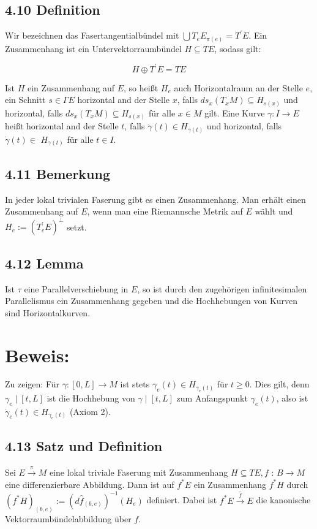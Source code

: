 \subsection*{4.10 Definition}
Wir bezeichnen das Fasertangentialbündel mit $\bigcup T_{e} E_{\pi(e)}=T^{\prime} E$. Ein Zusammenhang ist ein Untervektorraumbündel $H \subseteq T E$, sodass gilt:

$$
H \oplus T^{\prime} E=T E
$$

Ist $H$ ein Zusammenhang auf $E$, so heißt $H_{e}$ auch Horizontalraum an der Stelle $e$, ein Schnitt $s \in \Gamma E$ horizontal and der Stelle $x$, falls $d s_{x}\left(T_{x} M\right) \subseteq H_{s(x)}$ und horizontal, falls $d s_{x}\left(T_{x} M\right) \subseteq H_{s(x)}$ für alle $x \in M$ gilt. Eine Kurve $\gamma: I \rightarrow E$ heißt horizontal and der Stelle $t$, falls $\dot{\gamma}(t) \in H_{\gamma(t)}$ und horizontal, falls $\dot{\gamma}(t) \in$ $H_{\gamma(t)}$ für alle $t \in I$.

\subsection*{4.11 Bemerkung}
In jeder lokal trivialen Faserung gibt es einen Zusammenhang. Man erhält einen Zusammenhang auf $E$, wenn man eine Riemannsche Metrik auf $E$ wählt und $H_{e}:=\left(T_{e}^{\prime} E\right)^{\perp}$ setzt.

\subsection*{4.12 Lemma}
Ist $\tau$ eine Parallelverschiebung in $E$, so ist durch den zugehörigen infinitesimalen Parallelismus ein Zusammenhang gegeben und die Hochhebungen von Kurven sind Horizontalkurven.

\section*{Beweis:}
Zu zeigen: Für $\gamma:[0, L] \rightarrow M$ ist stets $\gamma_{e}(t) \in H_{\gamma_{e}(t)}$ für $t \geq 0$. Dies gilt, denn $\gamma_{e} \mid[t, L]$ ist die Hochhebung von $\gamma \mid[t, L]$ zum Anfangspunkt $\gamma_{e}(t)$, also ist $\dot{\gamma}_{e}(t) \in H_{\gamma_{e}(t)}$ (Axiom 2).

\subsection*{4.13 Satz und Definition}
Sei $E \xrightarrow{\pi} M$ eine lokal triviale Faserung mit Zusammenhang $H \subseteq T E, f$ : $B \rightarrow M$ eine differenzierbare Abbildung. Dann ist auf $f^{*} E$ ein Zusammenhang $f^{*} H$ durch $\left(f^{*} H\right)_{(b, e)}:=\left(d \hat{f}_{(b, e)}\right)^{-1}\left(H_{e}\right)$ definiert. Dabei ist $f^{*} E \xrightarrow{\hat{f}} E$ die kanonische Vektorraumbündelabbildung über $f$.

